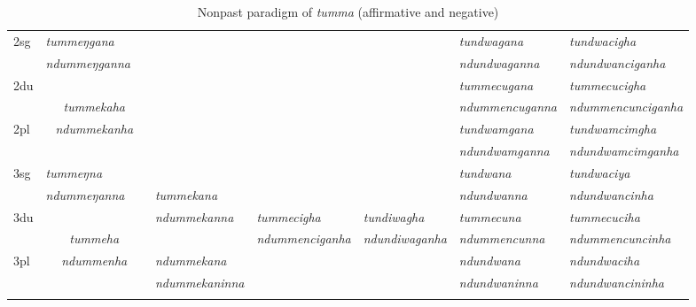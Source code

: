 \begin{sidewaystable}[p]
{{\begin{tabular}{|l||p{2.4cm}|p{2.0cm}|p{2.6cm}|p{2.8cm}|p{2.6cm}|p{3.2cm}|p{3.2cm}|}
\hline				
{\sc 2sg} 		&	\emph{tummeŋgana}  &	    & \multicolumn{3}{c|}{ \cellcolor[gray]{.8}}& \emph{tundwagana}  &   \emph{tundwacigha}\\
		&  \emph{ndummeŋganna} &  & \multicolumn{3}{c|}{ \cellcolor[gray]{.8}}&\emph{ ndundwaganna} &\emph{ndundwanciganha}  \\
 \cline{1-2} \cline{7-8}			
{\sc 2du}		&	\multicolumn{2}{c|}{}     & \multicolumn{3}{c|}{\cellcolor[gray]{.8}} & \emph{tummecugana}  &  \emph{tummecucigha} \\
		&  	\multicolumn{2}{c|}{\emph{tummekaha}} & \multicolumn{3}{c|}{\cellcolor[gray]{.8} }&\emph{ndummencuganna}  & \emph{ndummencunciganha} \\
 \cline{1-1} \cline{7-8}			
{\sc 2pl}		&	\multicolumn{2}{c|}{\emph{ndummekanha}} & \multicolumn{3}{c|}{ \cellcolor[gray]{.8}}& \emph{tundwamgana}& \emph{tundwamcimgha}  \\
		&	\multicolumn{2}{c|}{ }& \multicolumn{3}{c|}{\cellcolor[gray]{.8}}&\emph{ ndundwamganna} & \emph{ndundwamcimganha} \\
\hline			
{\sc 3sg} 		&\emph{tummeŋna}	  &	      	&  			&    &    	&\emph{tundwana}&\emph{tundwaciya}\\
		& \emph{ndummeŋanna}   &   	& \emph{tummekana}	&  &   &\emph{ndundwanna}&\emph{ndundwancinha}\\
  \cline{1-2}  \cline{7-8}					
{\sc 3du}& \multicolumn{2}{c|}{}&\emph{ndummekanna}& \emph{tummecigha}&\emph{tundiwagha}&  \emph{tummecuna} & \emph{ tummecuciha}\\
	& \multicolumn{2}{c|}{\emph{tummeha}}& &\emph{ndummenciganha}& \emph{ndundiwaganha} & \emph{ndummencunna} & \emph{ndummencuncinha}\\
 \cline{1-1} \cline{4-4} \cline{7-8}	
{\sc 3pl}&\multicolumn{2}{c|}{\emph{ndummenha}}	&\emph{ndummekana}& & &\emph{ndundwana}&\emph{ndundwaciha}\\	
	&\multicolumn{2}{c|}{ }&\emph{ndummekaninna}&& &\emph{ndundwaninna}&\emph{ndundwancininha} \\
\lspbottomrule
\end{tabular}
}
}
\caption{Nonpast paradigm of \emph{tumma}  (affirmative and negative)}\label{par-tund-npst}
\end{sidewaystable}



